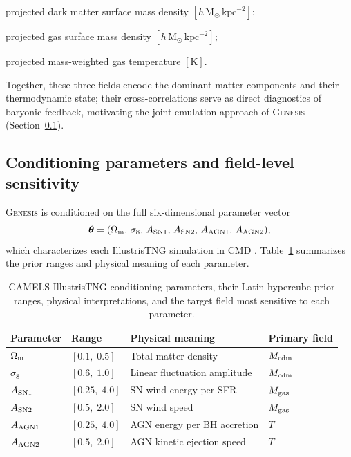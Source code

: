 \documentclass[usenatbib]{mnras}
\newcommand{\Mcdm}{M_{\rm cdm}}
\newcommand{\Mgas}{M_{\rm gas}}
\newcommand{\Tgas}{T}
\newcommand{\Om}{\Omega_{\rm m}}
\newcommand{\sig}{\sigma_8}
\begin{document}
\begin{description}[font=\normalfont,leftmargin=2.8em,labelsep=0.6em]
  \item[$\Mcdm$:] projected dark matter surface mass density
        $[h\,\mathrm{M}_\odot\,\mathrm{kpc}^{-2}]$;
  \item[$\Mgas$:] projected gas surface mass density
        $[h\,\mathrm{M}_\odot\,\mathrm{kpc}^{-2}]$;
  \item[$\Tgas$:] projected mass-weighted gas temperature $[\mathrm{K}]$.
\end{description}

Together, these three fields encode the dominant matter components and
their thermodynamic state; their cross-correlations serve as direct
diagnostics of baryonic feedback, motivating the joint emulation
approach of \textsc{Genesis} (Section~\ref{sec:params}).

\subsection{Conditioning parameters and field-level sensitivity}
\label{sec:params}

\textsc{Genesis} is conditioned on the full six-dimensional parameter
vector
\begin{equation}
  \boldsymbol{\theta} =
  (\Om,\,\sig,\,A_{\rm SN1},\,A_{\rm SN2},\,A_{\rm AGN1},\,A_{\rm AGN2}),
  \label{eq:theta}
\end{equation}
which characterizes each IllustrisTNG simulation in CMD
\citep{Villaescusa2021,Villaescusa2022}.
Table~\ref{tab:params} summarizes the prior ranges and physical
meaning of each parameter.

\begin{table}
  \centering
  \begin{tabular}{llll}
    \hline
    Parameter & Range & Physical meaning & Primary field \\
    \hline
    $\Om$          & $[0.1,\;0.5]$  & Total matter density
                    & $\Mcdm$ \\
    $\sig$         & $[0.6,\;1.0]$  & Linear fluctuation amplitude
                    & $\Mcdm$ \\
    $A_{\rm SN1}$  & $[0.25,\;4.0]$ & SN wind energy per SFR
                    & $\Mgas$ \\
    $A_{\rm SN2}$  & $[0.5,\;2.0]$  & SN wind speed
                    & $\Mgas$ \\
    $A_{\rm AGN1}$ & $[0.25,\;4.0]$ & AGN energy per BH accretion
                    & $\Tgas$ \\
    $A_{\rm AGN2}$ & $[0.5,\;2.0]$  & AGN kinetic ejection speed
                    & $\Tgas$ \\
    \hline
  \end{tabular}
  \caption{CAMELS IllustrisTNG conditioning parameters, their
    Latin-hypercube prior ranges, physical interpretations, and
    the target field most sensitive to each parameter.}
  \label{tab:params}
\end{table}
\end{document}
